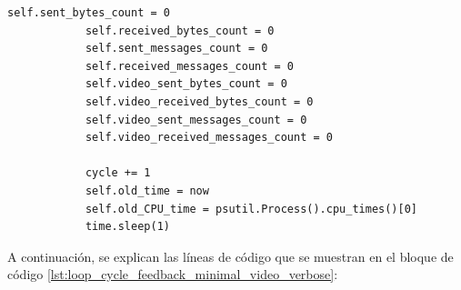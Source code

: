 \begin{lstlisting}[style=pythonstyle, caption={Método loop\_cycle\_feedback() de \textit{Minimal\_Video\_verbose}}, label={lst:loop_cycle_feedback_minimal_video_verbose}]
            self.sent_bytes_count = 0
            self.received_bytes_count = 0
            self.sent_messages_count = 0
            self.received_messages_count = 0
            self.video_sent_bytes_count = 0
            self.video_received_bytes_count = 0
            self.video_sent_messages_count = 0
            self.video_received_messages_count = 0

            cycle += 1
            self.old_time = now
            self.old_CPU_time = psutil.Process().cpu_times()[0]
            time.sleep(1)
\end{lstlisting}
\vspace{\baselineskip}

A continuación, se explican las líneas de código que se muestran en el bloque de código \ref{lst:loop_cycle_feedback_minimal_video_verbose}:

